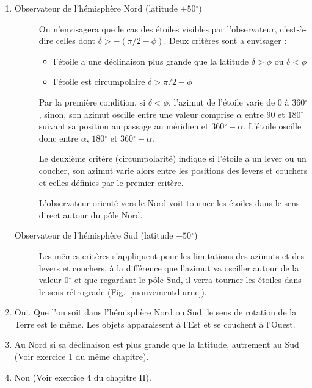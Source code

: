\documentclass[a4paper,10pt]{report}
\renewcommand{\deg}{\ensuremath{^{\circ}}}
\begin{document}
\begin{Answer}
  \begin{enumerate}
  \item
    \begin{description}
    \item[Observateur de l'hémisphère Nord (latitude $+50\deg$)] On
      n'envisagera que le cas des étoiles visibles par l'observateur,
      c'est-à-dire celles dont $\delta > -(\pi/2 - \phi)$. Deux
      critères sont a envisager :
      \begin{itemize}
      \item l'étoile a une déclinaison plus grande que la latitude
        $\delta>\phi$ ou $\delta<\phi$
      \item l'étoile est circumpolaire $\delta > \pi/2 - \phi$
      \end{itemize}
      Par la première condition, si $\delta<\phi$, l'azimut de
      l'étoile varie de 0 à $360\deg$, sinon, son azimut oscille
      entre une valeur comprise $\alpha$ entre 90 et $180\deg$
      suivant sa position au passage au méridien et
      $360\deg-\alpha$. L'étoile oscille donc entre $\alpha$,
      $180\deg$ et $360\deg-\alpha$.

      Le deuxième critère (circumpolarité) indique si l'étoile a un
      lever ou un coucher, son azimut varie alors entre les positions
      des levers et couchers et celles définies par le premier
      critère.

      L'observateur orienté vers le Nord voit tourner les étoiles dans
      le sens direct autour du pôle Nord.

    \item[Observateur de l'hémisphère Sud (latitude $-50\deg$)] Les
      mêmes critères s'appliquent pour les limitations des azimuts et
      des levers et couchers, à la différence que l'azimut va osciller
      autour de la valeur $0\deg$ et que regardant le pôle Sud, il
      verra tourner les étoiles dans le sens rétrograde
      (Fig.~\ref{mouvementdiurne}).
    \end{description}
  \item Oui. Que l'on soit dans l'hémisphère Nord ou Sud, le sens de
    rotation de la Terre est le même. Les objets apparaissent à l'Est
    et se couchent à l'Ouest.

  \item Au Nord si sa déclinaison est plus grande que la latitude,
    autrement au Sud (Voir exercice 1 du même chapitre).

  \item Non (Voir exercice 4 du chapitre II).
  \end{enumerate}
\end{Answer}
\end{document}

